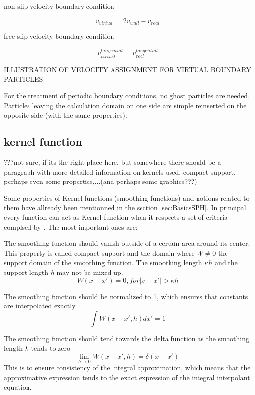 \documentclass{report}
\begin{document}
non slip velocity boundary condition

\begin{equation}
v_{virtual}=2v_{wall}-v_{real}
\end{equation}

free slip velocity boundary condition

\begin{equation}
v_{virtual}^{tangential}=v_{real}^{tangential}
\end{equation}

ILLUSTRATION OF VELOCITY ASSIGNMENT FOR VIRTUAL BOUNDARY PARTICLES

For the treatment of periodic boundary conditions, no ghost particles are
needed. Particles leaving the calculation domain on one side are simple
reinserted on the opposite side (with the same properties).


\subsection{kernel function}
???not sure, if its the right place here, but somewhere there should be a
paragraph with more detailed information on kernels used, compact support,
perhaps even some properties,...(and perhaps some graphics???)


Some properties of Kernel functions (smoothing functions) and notions related
to them have allready been mentionned in the section
\ref{sec:BasicsSPH}. In principal every function can act as Kernel function
when it respects a set of criteria complsed by \cite{Liu2003}.
The most important ones are:

The smoothing function should vanish outside of a certain area around its
center. This property is called compact support and the domain where $W\neq0$
the support domain of the smoothing function. The smoothing length $\kappa h$ and the
support length $h$ may not be mixed up.
\begin{equation}
W(x-x')=0,\textit{for}|x-x'|>\kappa h
\end{equation}

The smoothing function should be normalized to 1, which ensures that constants
are interpolated exactly
\begin{equation}
\int{W(x-x',h)dx'}=1
\end{equation}

The smoothing function should tend towards the delta function as the smoothing
length $h$ tends to zero
\begin{equation}
\lim\limits_{h \rightarrow 0}{W(x-x',h)}=\delta(x-x')
\end{equation}
This is to ensure consistency of the integral approximation, which means that
the approximative expression tends to the exact expression of the integral
interpolant equation.
\end{document}
